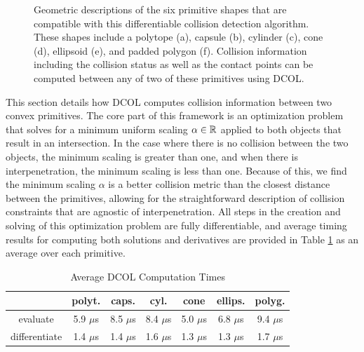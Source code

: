 \begin{figure}[!t]
{\label{fig_sphere}}
\hfil
{}
\caption{Geometric descriptions of the six primitive shapes that are compatible with this differentiable collision detection algorithm. These shapes include a polytope (a), capsule (b), cylinder (c), cone (d), ellipsoid (e), and padded polygon (f). Collision information including the collision status as well as the contact points can be computed between any of two of these primitives using DCOL.}
\label{fig_sim}
\end{figure}
This section details how DCOL computes collision information between two convex primitives.  The core part of this framework is an optimization problem that solves for a minimum uniform scaling $\alpha \in \mathbb{R}{}$ applied to both objects that result in an intersection. In the case where there is no collision between the two objects, the minimum scaling is greater than one, and when there is interpenetration, the minimum scaling is less than one. Because of this, we find the minimum scaling $\alpha$ is a better collision metric than the closest distance between the primitives, allowing for the straightforward description of collision constraints that are agnostic of interpenetration.  All steps in the creation and solving of this optimization problem are fully differentiable, and average timing results for computing both solutions and derivatives are provided in Table \ref{speed_table} as an average over each primitive.
\begin{table}[!t]
\centering 
\caption{Average DCOL Computation Times}
\begin{tabular}{c c c c c c c}
		\toprule
	                 &
                  \textbf{polyt.} & 
                  \textbf{caps.} & 
                  \textbf{cyl.} & 
                  \textbf{cone} & 
                  \textbf{ellips.} & 
                  \textbf{polyg.} \\
		\toprule
        evaluate & 5.9 $\mu$s &  8.5 $\mu$s     & 8.4 $\mu$s     & 5.0 $\mu$s     & 6.8 $\mu$s        & 9.4 $\mu$s       \\
differentiate &  1.4 $\mu$s                        &  1.4 $\mu$s     &  1.6 $\mu$s    &  1.3 $\mu$s    &   1.3 $\mu$s      &  1.7 $\mu$s      \\
		\toprule
\end{tabular}
\label{speed_table}
\end{table}
